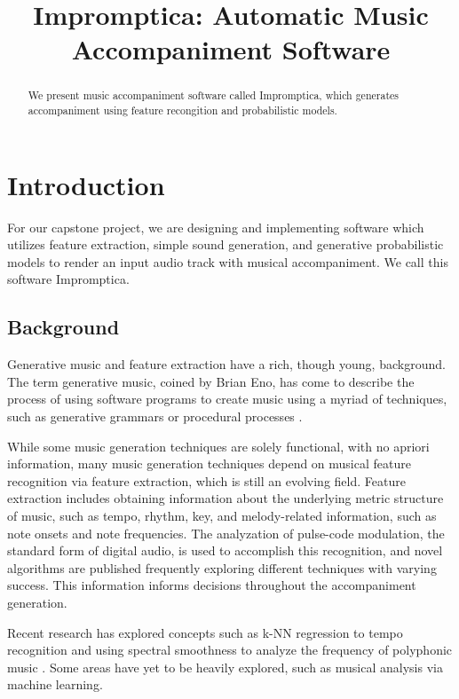 \documentclass[11pt,conference,letterpaper]{IEEEtran}
\begin{document}
\title{Impromptica: Automatic Music Accompaniment Software}
\author{}

\maketitle

\begin{abstract}
We present music accompaniment software called Impromptica, which generates accompaniment using feature recongition and probabilistic models.
\end{abstract}

\section{Introduction}

For our capstone project, we are designing and implementing software which utilizes feature extraction, simple sound generation, and generative probabilistic models to render an input audio track with musical accompaniment. We call this software Impromptica.

\subsection{Background}

Generative music and feature extraction have a rich, though young, background. The term generative music, coined by Brian Eno, has come to describe the process of using software programs to create music using a myriad of techniques, such as generative grammars or procedural processes \cite{wooller2005framework}. 

While some music generation techniques are solely functional, with no apriori information, many music generation techniques depend on musical feature recognition via feature extraction, which is still an evolving field. Feature extraction includes obtaining information about the underlying metric structure of music, such as tempo, rhythm, key, and melody-related information, such as note onsets and note frequencies. The analyzation of pulse-code modulation, the standard form of digital audio, is used to accomplish this recognition, and novel algorithms are published frequently exploring different techniques with varying success. This information informs decisions throughout the accompaniment generation. 

Recent research has explored concepts such as k-NN regression to tempo recognition \cite{eronen2010music} and using spectral smoothness to analyze the frequency of polyphonic music \cite{klapuri2003multiple}. Some areas have yet to be heavily explored, such as musical analysis via machine learning.
\end{document}
